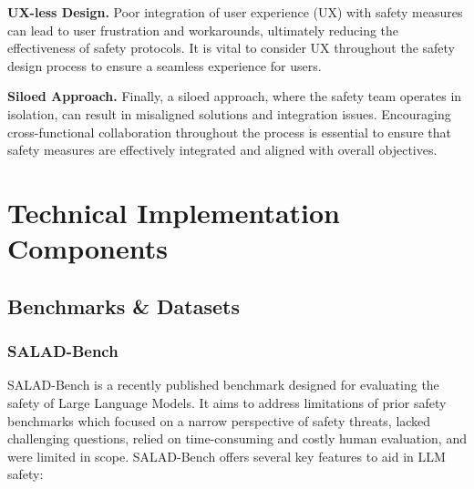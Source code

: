 \textbf{UX-less Design.} Poor integration of user experience (UX) with safety measures can lead to user frustration and workarounds, ultimately reducing the effectiveness of safety protocols. It is vital to consider UX throughout the safety design process to ensure a seamless experience for users.

\textbf{Siloed Approach.} Finally, a siloed approach, where the safety team operates in isolation, can result in misaligned solutions and integration issues. Encouraging cross-functional collaboration throughout the process is essential to ensure that safety measures are effectively integrated and aligned with overall objectives.

\section{Technical Implementation Components}

\subsection{Benchmarks \& Datasets}

\subsubsection{SALAD-Bench}

SALAD-Bench  is a recently published benchmark designed for evaluating the safety of Large Language Models. It aims to address limitations of prior safety benchmarks which focused on a narrow perspective of safety threats, lacked challenging questions, relied on time-consuming and costly human evaluation, and were limited in scope. SALAD-Bench offers several key features to aid in LLM safety:

